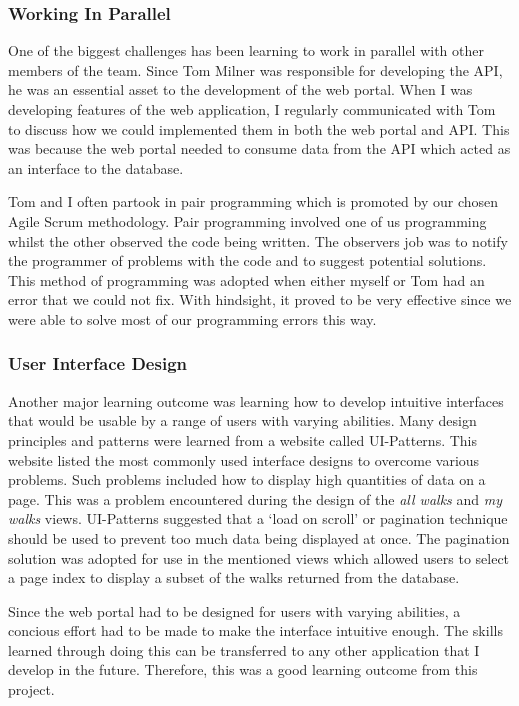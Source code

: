 \documentclass[11pt,a4paper]{report}
\begin{document}
\subsubsection{Working In Parallel}
One of the biggest challenges has been learning to work in parallel with other members of the team. Since Tom Milner was responsible for developing the API, he was an essential asset to the development of the web portal. When I was developing features of the web application, I regularly communicated with Tom to discuss how we could implemented them in both the web portal and API. This was because the web portal needed to consume data from the API which acted as an interface to the database.

Tom and I often partook in pair programming which is promoted by our chosen Agile Scrum methodology. Pair programming involved one of us programming whilst the other observed the code being written. The observers job was to notify the programmer of problems with the code and to suggest potential solutions. This method of programming was adopted when either myself or Tom had an error that we could not fix. With hindsight, it proved to be very effective since we were able to solve most of our programming errors this way.

\subsubsection{User Interface Design}
Another major learning outcome was learning how to develop intuitive interfaces that would be usable by a range of users with varying abilities. Many design principles and patterns were learned from a website called UI-Patterns\cite{uipatterns}. This website listed the most commonly used interface designs to overcome various problems. Such problems included how to display high quantities of data on a page. This was a problem encountered during the design of the \emph{all walks} and \emph{my walks} views. UI-Patterns suggested that a `load on scroll' or pagination technique should be used to prevent too much data being displayed at once. The pagination solution was adopted for use in the mentioned views which allowed users to select a page index to display a subset of the walks returned from the database.

Since the web portal had to be designed for users with varying abilities, a concious effort had to be made to make the interface intuitive enough. The skills learned through doing this can be transferred to any other application that I develop in the future. Therefore, this was a good learning outcome from this project.
\end{document}

